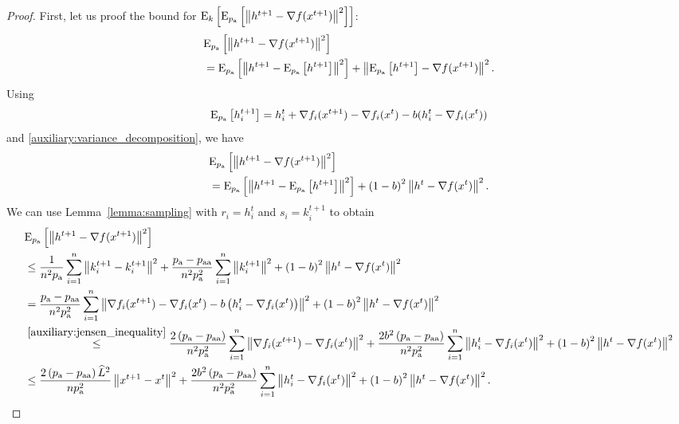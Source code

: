 \documentclass{article}
\newcommand*{\probavailable}{\ensuremath{p_{\textnormal{a}}}}
\newcommand*{\probpairaa}{\ensuremath{p_{\textnormal{aa}}}}
\begin{document}
\begin{proof}
  First, let us proof the bound for $\ExpSub{k}{\ExpSub{\probavailable}{\norm{h^{t+1} - \nabla f(x^{t+1})}^2}}$:
  \begin{align*}
      &\ExpSub{\probavailable}{\norm{h^{t+1} - \nabla f(x^{t+1})}^2} \\
      &=\ExpSub{\probavailable}{\norm{h^{t+1} - \ExpSub{\probavailable}{h^{t+1}}}^2} + \norm{\ExpSub{\probavailable}{h^{t+1}} - \nabla f(x^{t+1})}^2.
  \end{align*}
  Using
  \begin{align*}
      \ExpSub{\probavailable}{h^{t+1}_i} = h^{t}_i + \nabla f_i(x^{t+1}) - \nabla f_i(x^{t}) - b(h^t_i - \nabla f_i(x^{t}))
  \end{align*}
  and \eqref{auxiliary:variance_decomposition}, we have
  \begin{align*}
    &\ExpSub{\probavailable}{\norm{h^{t+1} - \nabla f(x^{t+1})}^2} \\
    &=\ExpSub{\probavailable}{\norm{h^{t+1} - \ExpSub{\probavailable}{h^{t+1}}}^2} + \left(1 - b\right)^2 \norm{h^{t} - \nabla f(x^{t})}^2.
  \end{align*}
  We can use Lemma~\ref{lemma:sampling} with $r_i = h^{t}_i$ and $s_i = k^{t+1}_i$ to obtain
  \begin{align*}
    &\ExpSub{\probavailable}{\norm{h^{t+1} - \nabla f(x^{t+1})}^2} \\
    &\leq \frac{1}{n^2 \probavailable}\sum_{i=1}^n\norm{k^{t+1}_i - k^{t+1}_i}^2 +\frac{\probavailable - \probpairaa}{n^2 \probavailable^2}\sum_{i=1}^n\norm{k^{t+1}_i}^2 + \left(1 - b\right)^2 \norm{h^{t} - \nabla f(x^{t})}^2\\
    &= \frac{\probavailable - \probpairaa}{n^2 \probavailable^2}\sum_{i=1}^n\norm{\nabla f_i(x^{t+1}) - \nabla f_i(x^{t}) - b \left(h^t_i - \nabla f_i(x^{t})\right)}^2 + \left(1 - b\right)^2 \norm{h^{t} - \nabla f(x^{t})}^2\\
    &\overset{\eqref{auxiliary:jensen_inequality}}{\leq} \frac{2\left(\probavailable - \probpairaa\right)}{n^2 \probavailable^2}\sum_{i=1}^n\norm{\nabla f_i(x^{t+1}) - \nabla f_i(x^{t})}^2 + \frac{2 b^2 \left(\probavailable - \probpairaa\right)}{n^2 \probavailable^2}\sum_{i=1}^n\norm{h^t_i - \nabla f_i(x^{t})}^2 + \left(1 - b\right)^2 \norm{h^{t} - \nabla f(x^{t})}^2\\
    &\leq \frac{2\left(\probavailable - \probpairaa\right)\widehat{L}^2}{n \probavailable^2} \norm{x^{t+1} - x^{t}}^2 + \frac{2 b^2 \left(\probavailable - \probpairaa\right)}{n^2 \probavailable^2}\sum_{i=1}^n\norm{h^t_i - \nabla f_i(x^{t})}^2 + \left(1 - b\right)^2 \norm{h^{t} - \nabla f(x^{t})}^2.

\end{align*}
\end{proof}
\end{document}
